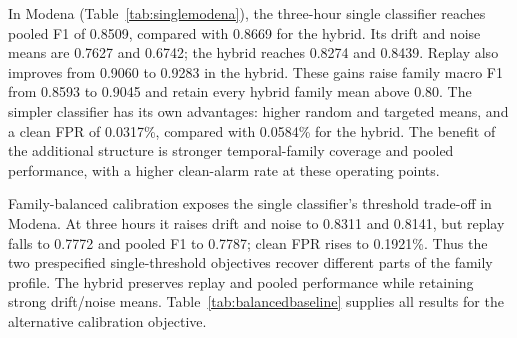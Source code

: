 In Modena (Table~\ref{tab:singlemodena}), the three-hour single classifier reaches pooled F1 of 0.8509, compared with 0.8669 for the hybrid. Its drift and noise means are 0.7627 and 0.6742; the hybrid reaches 0.8274 and 0.8439. Replay also improves from 0.9060 to 0.9283 in the hybrid. These gains raise family macro F1 from 0.8593 to 0.9045 and retain every hybrid family mean above 0.80. The simpler classifier has its own advantages: higher random and targeted means, and a clean FPR of 0.0317\%, compared with 0.0584\% for the hybrid. The benefit of the additional structure is stronger temporal-family coverage and pooled performance, with a higher clean-alarm rate at these operating points.

Family-balanced calibration exposes the single classifier's threshold trade-off in Modena. At three hours it raises drift and noise to 0.8311 and 0.8141, but replay falls to 0.7772 and pooled F1 to 0.7787; clean FPR rises to 0.1921\%. Thus the two prespecified single-threshold objectives recover different parts of the family profile. The hybrid preserves replay and pooled performance while retaining strong drift/noise means. Table~\ref{tab:balancedbaseline} supplies all results for the alternative calibration objective.
